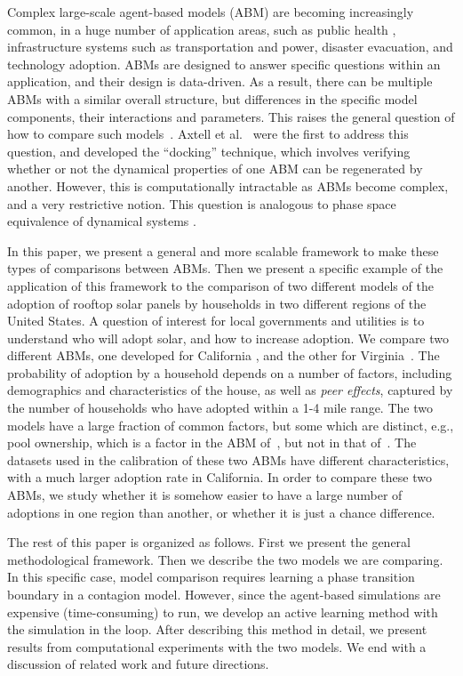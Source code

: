 Complex large-scale agent-based models (ABM) are becoming increasingly common, in a huge number of application areas,
such as public health \cite{epi}, infrastructure systems such as transportation and power, disaster evacuation, and
technology adoption.
ABMs are designed to answer specific questions within an application, and their design is data-driven.
As a result, there can be multiple ABMs with a similar overall structure, but differences in the
specific model components, their interactions and parameters.
This raises the general question of how to compare such models~\cite{axtell96aligning,burton99validation}.
Axtell et al.~\cite{axtell96aligning} were the first to address this question, and developed the ``docking'' technique,
which involves verifying whether or not the dynamical properties of one ABM can be regenerated by another.
However, this is computationally intractable as ABMs become complex, and a very restrictive notion.
This question is analogous to phase space equivalence of dynamical systems \cite{ref}.

In this paper, we present a general and more scalable framework to make these types of comparisons between ABMs.
Then we present a specific example of the application of this framework to the comparison of two different 
models of the adoption of rooftop solar panels by households in two different regions of the United States.
A question of interest for local governments and utilities is to
understand who will adopt solar, and how to increase adoption.
We compare two different ABMs, one developed for California \cite{zhang16solar},
and the other for Virginia~\cite{hu19rooftop}. The probability of adoption by a household depends on a number of factors,
including demographics and characteristics of the house, as well as \emph{peer effects}, captured by the number of
households who have adopted within a 1-4 mile range. The two models have a large fraction of common factors,
but some which are distinct, e.g., pool ownership, which is a factor in the ABM of~\cite{zhang16solar},
but not in that of~\cite{hu19rooftop}. The datasets used in the calibration of these two ABMs have different
characteristics, with a much larger adoption rate in California.
In order to compare these two ABMs, we study whether it is somehow easier to have a large number of adoptions 
in one region than another, or whether it is just a chance difference. 



The rest of this paper is organized as follows. First we present the general methodological framework. Then we describe the two models we are comparing. In this specific case, model comparison requires learning a phase transition boundary in a contagion model. However, since the agent-based simulations are expensive (time-consuming) to run, we develop an active learning method with the simulation in the loop. After describing this method in detail, we present results from computational experiments with the two models. We end with a discussion of related work and future directions.
